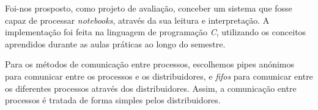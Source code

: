 \documentclass[12pt]{report}
\newcommand\tab[1][0.5cm]{\hspace*{#1}}
\begin{document}
\tab Foi-nos prosposto, como projeto de avaliação, conceber um sistema que fosse capaz de processar \textit{notebooks}, através da sua leitura e  interpretação. A implementação foi feita na linguagem de programação \textit{C}, utilizando os conceitos aprendidos durante as aulas práticas ao longo do semestre. 

Para os métodos de comunicação entre processos, escolhemos pipes anónimos para comunicar entre os processos e os distribuidores, e \textit{fifos} para comunicar entre os diferentes processos através dos distribuidores. Assim, a comunicação entre processos é tratada de forma simples pelos distribuidores.
\end{document}
